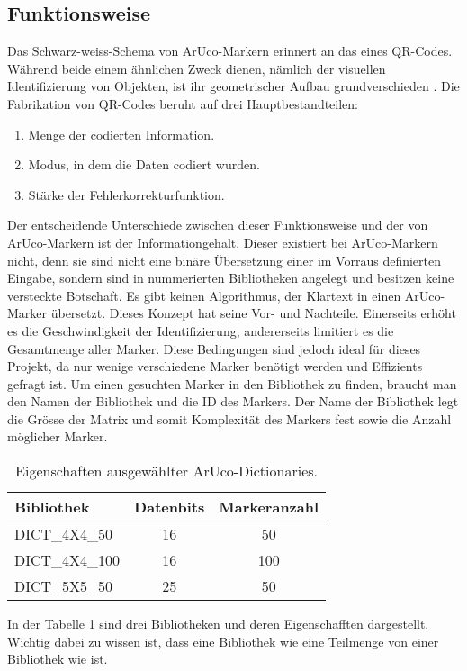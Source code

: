 \subsection{Funktionsweise}
Das Schwarz-weiss-Schema von ArUco-Markern erinnert an das eines QR-Codes. Während beide einem ähnlichen Zweck dienen, nämlich der visuellen Identifizierung von Objekten, ist ihr geometrischer Aufbau grundverschieden \cite{ten:qrcode}.
Die Fabrikation von QR-Codes beruht auf drei Hauptbestandteilen:

\begin{enumerate}
    \item Menge der codierten Information.
    \item Modus, in dem die Daten codiert wurden.
    \item Stärke der Fehlerkorrekturfunktion.
\end{enumerate}

Der entscheidende Unterschiede zwischen dieser Funktionsweise und der von ArUco-Markern ist der Informationgehalt. Dieser existiert bei ArUco-Markern nicht, denn sie sind nicht eine binäre Übersetzung einer im Vorraus definierten Eingabe, sondern sind in nummerierten Bibliotheken angelegt und besitzen keine versteckte Botschaft. Es gibt keinen Algorithmus, der Klartext in einen ArUco-Marker übersetzt. Dieses Konzept hat seine Vor- und Nachteile. Einerseits erhöht es die Geschwindigkeit der Identifizierung, andererseits limitiert es die Gesamtmenge aller Marker. Diese Bedingungen sind jedoch ideal für dieses Projekt, da nur wenige verschiedene Marker benötigt werden und Effizients gefragt ist. 
Um einen gesuchten Marker in den Bibliothek zu finden, braucht man den Namen der Bibliothek und die ID des Markers. Der Name der Bibliothek legt die Grösse der Matrix und somit Komplexität des Markers fest sowie die Anzahl möglicher Marker.

\begin{table}[h]
    \centering
    \begin{tabular}{lcc}
        \toprule
        \textbf{Bibliothek} & \textbf{Datenbits} & \textbf{Markeranzahl} \\
        \midrule
        DICT\_4X4\_50 & 16 & 50 \\
        DICT\_4X4\_100 & 16 & 100 \\
        DICT\_5X5\_50 & 25 & 50 \\
        \bottomrule
    \end{tabular}
    \caption{Eigenschaften ausgewählter ArUco-Dictionaries.}
    \label{tab:aruco_dicts}
\end{table}

In der Tabelle \ref{tab:aruco_dicts} sind drei Bibliotheken und deren Eigenschafften dargestellt. Wichtig dabei zu wissen ist, dass eine Bibliothek wie  eine Teilmenge von einer Bibliothek wie  ist.

\endgroup